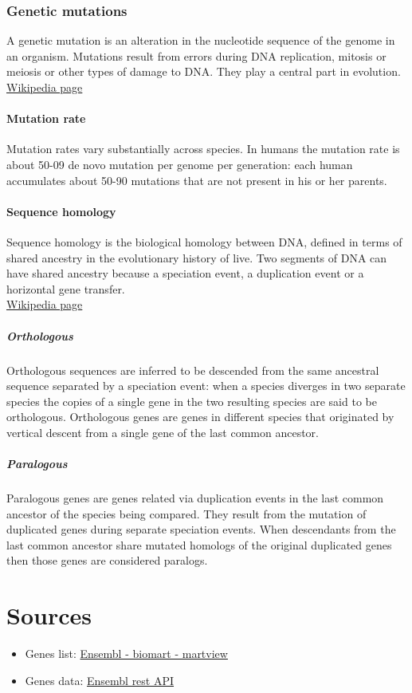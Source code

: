 \subsection{Genetic mutations}
A genetic mutation is an alteration in the nucleotide sequence of the genome in an organism.
Mutations result from errors during DNA replication, mitosis or meiosis or other types of damage to DNA.
They play a central part in evolution.\\
\href{https://en.wikipedia.org/wiki/Mutation}{Wikipedia page}
\subsubsection{Mutation rate}
Mutation rates vary substantially across species.
In humans the mutation rate is about 50-09 de novo mutation per genome per generation: each human accumulates about 50-90 mutations that are not present in his or her parents.
\subsubsection{Sequence homology}
Sequence homology is the biological homology between DNA, defined in terms of shared ancestry in the evolutionary history of live.
Two segments of DNA can have shared ancestry because a speciation event, a duplication event or a horizontal gene transfer.\\
\href{https://en.wikipedia.org/wiki/Sequence_homology}{Wikipedia page}
\paragraph{Orthologous}
Orthologous sequences are inferred to be descended from the same ancestral sequence separated by a speciation event: when a species diverges in two separate species the copies of a single gene in the two resulting species are said to be orthologous.
Orthologous genes are genes in different species that originated by vertical descent from a single gene of the last common ancestor.
\paragraph{Paralogous}
Paralogous genes are genes related via duplication events in the last common ancestor of the species being compared.
They result from the mutation of duplicated genes during separate speciation events.
When descendants from the last common ancestor share mutated homologs of the original duplicated genes then those genes are considered paralogs.

\chapter{Sources}
\begin{itemize}
	\item Genes list: \href{https://www.ensembl.org/biomart/martview}{Ensembl - biomart - martview}
	\item Genes data: \href{https://rest.ensembl.org}{Ensembl rest API}
\end{itemize}

